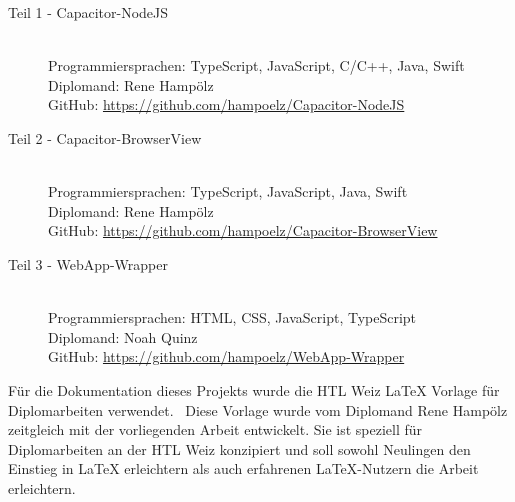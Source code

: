 
\begin{description}
    \item[Teil 1 - Capacitor-NodeJS] \hfill\\
    Programmiersprachen: TypeScript, JavaScript, C/C++, Java, Swift\\
    Diplomand: Rene Hampölz\\
    GitHub: \href{https://github.com/hampoelz/Capacitor-NodeJS}{https://github.com/hampoelz/Capacitor-NodeJS}
    \item[Teil 2 - Capacitor-BrowserView] \hfill\\
    Programmiersprachen: TypeScript, JavaScript, Java, Swift\\
    Diplomand: Rene Hampölz\\
    GitHub: \href{https://github.com/hampoelz/Capacitor-BrowserView}{https://github.com/hampoelz/Capacitor-BrowserView}
    \item[Teil 3 - WebApp-Wrapper] \hfill\\
    Programmiersprachen: HTML, CSS, JavaScript, TypeScript\\
    Diplomand: Noah Quinz\\
    GitHub: \href{https://github.com/hampoelz/WebApp-Wrapper}{https://github.com/hampoelz/WebApp-Wrapper}
\end{description}

\begin{note}
    Für die Dokumentation dieses Projekts wurde die HTL Weiz LaTeX Vorlage für Diplomarbeiten verwendet.~\cite{template:latex} Diese Vorlage wurde vom Diplomand Rene Hampölz zeitgleich mit der vorliegenden Arbeit entwickelt.
    Sie ist speziell für Diplomarbeiten an der HTL Weiz konzipiert und soll sowohl Neulingen den Einstieg in LaTeX erleichtern als auch erfahrenen LaTeX-Nutzern die Arbeit erleichtern.
\end{note}

\printChangelog
